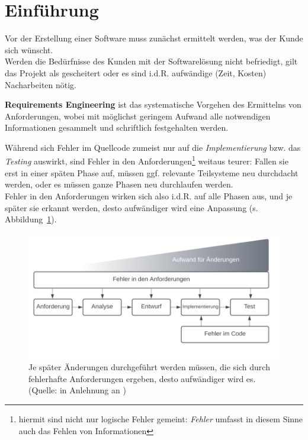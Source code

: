 \section{Einführung}

\noindent
Vor der Erstellung einer Software muss zunächst ermittelt werden, was der Kunde sich wünscht.\\
Werden die Bedürfnisse des Kunden mit der Softwarelösung nicht befriedigt, gilt das Projekt als gescheitert oder es sind i.d.R. aufwändige (Zeit, Kosten) Nacharbeiten nötig.\\

\vspace{5mm}
\begin{tcolorbox}
    \textbf{Requirements Engineering} ist das systematische Vorgehen des Ermittelns von Anforderungen,
    wobei mit möglichst geringem Aufwand alle notwendigen Informationen gesammelt und schriftlich festgehalten werden.
\end{tcolorbox}
\vspace{5mm}

\noindent
Während sich Fehler im Quellcode zumeist nur auf die \textit{Implementierung} bzw. das \textit{Testing} auswirkt, sind Fehler in den Anforderungen\footnote{
hiermit sind nicht nur logische Fehler gemeint: \textit{Fehler} umfasst in diesem Sinne auch das Fehlen von Informationen
} weitaus teurer: Fallen sie erst in einer späten Phase auf, müssen ggf. relevante Teilsysteme neu durchdacht werden, oder es müssen ganze Phasen neu durchlaufen werden.\\
Fehler in den Anforderungen wirken sich also i.d.R. auf alle Phasen aus, und je später sie erkannt werden, desto aufwändiger wird eine Anpassung (s. Abbildung~\ref{fig:aufwand}).

\begin{figure}
    \centering
    \includegraphics[scale=0.4]{part one/Requirements Engineering/img/aufwand}
    \caption{Je später Änderungen durchgeführt werden müssen, die sich durch fehlerhafte Anforderungen ergeben, desto aufwändiger wird es. (Quelle: in Anlehnung an \cite[38 f., Abb. 4.1 und 4.2]{Wed09})}
    \label{fig:aufwand}
\end{figure}

